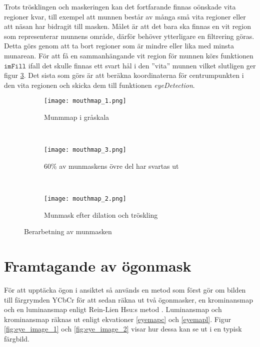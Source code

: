 \documentclass[a4paper,12pt,oneside,final]{extbook}
\begin{document}
Trots trösklingen och maskeringen kan det fortfarande finnas oönskade vita regioner kvar, till exempel att munnen består av många små vita regioner eller att näsan har bidragit till masken. Målet är att det bara ska finnas en vit region som representerar munnens område, därför behöver ytterligare en filtrering göras. Detta görs genom att ta bort regioner som är mindre eller lika med minsta munarean. För att få en sammanhängande vit region för munnen körs funktionen $\mathtt{imFill}$ ifall det skulle finnas ett svart hål i den ''vita'' munnen vilket slutligen ger figur \ref{fig:mouthmap_3}. Det sista som görs är att beräkna koordinaterna för centrumpunkten i den vita regionen och skicka dem till funktionen \textit{eyeDetection}.

\begin{figure}[h]
    \centering
    \begin{subfigure}[b]{0.25\textwidth}
        \texttt{[image: mouthmap\_1.png]}
        \caption{Munmmap i gråskala \break}
        \label{fig:mouthmap_1}
    \end{subfigure}
    ~ %
    \begin{subfigure}[b]{0.25\textwidth}
        \texttt{[image: mouthmap\_3.png]}
        \caption{60\% av munmaskens övre del har svartas ut}
        \label{fig:mouthmap_2}
    \end{subfigure}
    ~%
    \begin{subfigure}[b]{0.25\textwidth}
        \texttt{[image: mouthmap\_2.png]}
        \caption{Munmask efter dilation och tröskling}
        \label{fig:mouthmap_3}
    \end{subfigure}
    \caption{Berarbetning av munmasken}\label{fig:mouthmap}
\end{figure}


\section{Framtagande av ögonmask}

För att upptäcka ögon i ansiktet så används en metod som först gör om bilden till färgrymden YCbCr för att sedan räkna ut två ögonmasker, en krominansmap och en luminansmap enligt Rein-Lien Hsu:s metod \cite{FDiCI}. Luminansmap och krominansmap räknas ut enligt ekvationer \ref{eyemapc} och \ref{eyemapl}. Figur \ref{fig:eye_image_1} och \ref{fig:eye_image_2} visar hur dessa kan se ut i en typisk färgbild.
\end{document}
